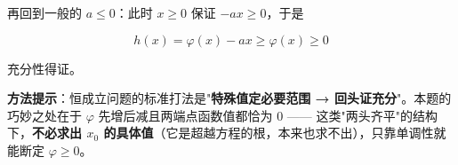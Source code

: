 \begin{answer}
再回到一般的 $a\le0$：此时 $x\ge0$ 保证 $-ax\ge0$，于是

\nopagebreak[4]
\[h(x)=\varphi(x)-ax\ge\varphi(x)\ge0\]

充分性得证。

\begin{gktip}
\textbf{方法提示}：恒成立问题的标准打法是"\textbf{特殊值定必要范围 → 回头证充分}"。本题的巧妙之处在于 $\varphi$ 先增后减且两端点函数值都恰为 $0$ —— 这类"两头齐平"的结构下，\textbf{不必求出 $x_0$ 的具体值}（它是超越方程的根，本来也求不出），只靠单调性就能断定 $\varphi\ge0$。
\end{gktip}



\par\medskip

\end{answer}
